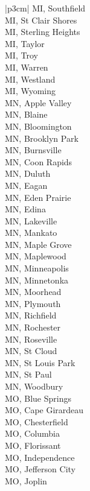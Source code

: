 \begin{customLongTable}{ |p{3cm}| }
MI, Southfield \\ \hline
MI, St Clair Shores \\ \hline
MI, Sterling Heights \\ \hline
MI, Taylor \\ \hline
MI, Troy \\ \hline
MI, Warren \\ \hline
MI, Westland \\ \hline
MI, Wyoming \\ \hline
MN, Apple Valley \\ \hline
MN, Blaine \\ \hline
MN, Bloomington \\ \hline
MN, Brooklyn Park \\ \hline
MN, Burnsville \\ \hline
MN, Coon Rapids \\ \hline
MN, Duluth \\ \hline
MN, Eagan \\ \hline
MN, Eden Prairie \\ \hline
MN, Edina \\ \hline
MN, Lakeville \\ \hline
MN, Mankato \\ \hline
MN, Maple Grove \\ \hline
MN, Maplewood \\ \hline
MN, Minneapolis \\ \hline
MN, Minnetonka \\ \hline
MN, Moorhead \\ \hline
MN, Plymouth \\ \hline
MN, Richfield \\ \hline
MN, Rochester \\ \hline
MN, Roseville \\ \hline
MN, St Cloud \\ \hline
MN, St Louis Park \\ \hline
MN, St Paul \\ \hline
MN, Woodbury \\ \hline
MO, Blue Springs \\ \hline
MO, Cape Girardeau \\ \hline
MO, Chesterfield \\ \hline
MO, Columbia \\ \hline
MO, Florissant \\ \hline
MO, Independence \\ \hline
MO, Jefferson City \\ \hline
MO, Joplin \\ \hline

\end{customLongTable}
